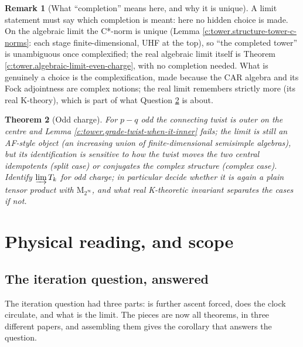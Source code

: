 \documentclass[11pt]{article}
\newtheorem{theorem}{Theorem}[section]
\theoremstyle{definition}
\newtheorem{remark}[theorem]{Remark}
\theoremstyle{plain}
\providecommand{\Mat}{}\renewcommand{\Mat}{\mathrm{M}}
\begin{document}
\begin{remark}[What ``completion'' means here, and why it is unique]\label{c:note.tower.what-completion-means-here-why-it}
A limit statement must say which completion is meant: here no hidden choice is made. On the algebraic limit the C*-norm is unique (Lemma \ref{c:tower.structure-tower-c-norms}: each stage finite-dimensional, UHF at the top), so ``the completed tower'' is unambiguous once complexified; the real algebraic limit itself is Theorem \ref{c:tower.algebraic-limit-even-charge}, with no completion needed. What is genuinely a choice is the complexification, made because the CAR algebra and its Fock adjointness are complex notions; the real limit remembers strictly more (its real K-theory), which is part of what Question \ref{c:q.tower.odd-charge} is about.
\end{remark}

\begin{theorem}[Odd charge]\label{c:q.tower.odd-charge}
For $p - q$ odd the connecting twist is outer on the centre and Lemma \ref{c:tower.grade-twist-when-it-inner} fails; the limit is still an AF-style object (an increasing union of finite-dimensional semisimple algebras), but its identification is sensitive to how the twist moves the two central idempotents (split case) or conjugates the complex structure (complex case). Identify $\varinjlim T_k$ for odd charge; in particular decide whether it is again a plain tensor product with $\Mat_{2^\infty}$, and what real K-theoretic invariant separates the cases if not.
\end{theorem}

\section{Physical reading, and scope}

\subsection*{The iteration question, answered}
\label{c:note.tower.setting-iteration-question-answered}
The iteration question had three parts: is further ascent forced, does the clock circulate, and what is the limit. The pieces are now all theorems, in three different papers, and assembling them gives the corollary that answers the question.
\end{document}
